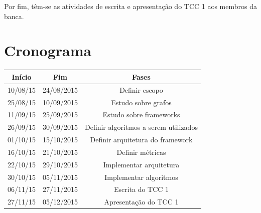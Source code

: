 Por fim, têm-se as atividades de escrita e apresentação do TCC 1 aos membros da banca.

\section*{Cronograma}
\label{sec:cronograma}


\begin{tabular}{SSS} \toprule
    {Início} & {Fim} & {Fases} \\ \toprule
    {10/08/15} & {24/08/2015} & {Definir escopo} \\
    {25/08/15} & {10/09/2015} & {Estudo sobre grafos} \\
    {11/09/15} & {25/09/2015} & {Estudo sobre frameworks} \\ \midrule
    {26/09/15} & {30/09/2015} & {Definir algoritmos a serem utilizados} \\
    {01/10/15} & {15/10/2015} & {Definir arquitetura do framework} \\
    {16/10/15} & {21/10/2015} & {Definir métricas} \\ \midrule
    {22/10/15} & {29/10/2015} & {Implementar arquitetura} \\
    {30/10/15} & {05/11/2015} & {Implementar algoritmos} \\ \midrule
    {06/11/15} & {27/11/2015} & {Escrita do TCC 1} \\
    {27/11/15} & {05/12/2015} & {Apresentação do TCC 1} \\ \bottomrule
\end{tabular}

\postextual

 


